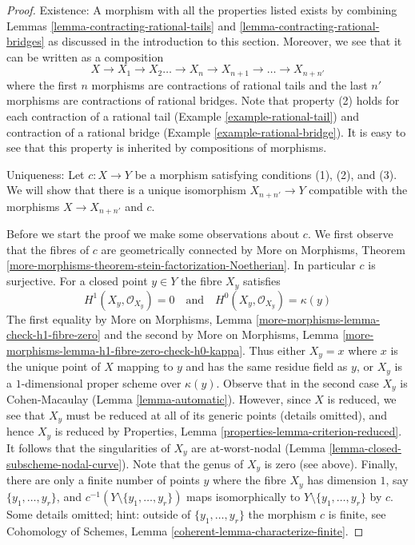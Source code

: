 \begin{proof}
Existence: A morphism with all the properties listed exists by
combining Lemmas \ref{lemma-contracting-rational-tails} and
\ref{lemma-contracting-rational-bridges} as discussed in the
introduction to this section.
Moreover, we see that it can be written as a composition
$$
X \to X_1 \to X_2 \ldots \to X_n \to X_{n + 1} \to \ldots \to X_{n + n'}
$$
where the first $n$ morphisms are contractions of rational tails
and the last $n'$ morphisms are contractions of rational bridges.
Note that property (2) holds for each contraction of a rational
tail (Example \ref{example-rational-tail}) and contraction of a
rational bridge (Example \ref{example-rational-bridge}).
It is easy to see that this property is inherited by compositions of morphisms.

\medskip\noindent
Uniqueness: Let $c : X \to Y$ be a morphism satisfying conditions
(1), (2), and (3). We will show that there is a unique isomorphism
$X_{n + n'} \to Y$ compatible with the morphisms $X \to X_{n + n'}$ and $c$.

\medskip\noindent
Before we start the proof we make some observations about $c$.
We first observe that the fibres of $c$ are geometrically connected by
More on Morphisms, Theorem
\ref{more-morphisms-theorem-stein-factorization-Noetherian}.
In particular $c$ is surjective.
For a closed point $y \in Y$ the fibre $X_y$ satisfies
$$
H^1(X_y, \mathcal{O}_{X_y}) = 0
\quad\text{and}\quad
H^0(X_y, \mathcal{O}_{X_y}) = \kappa(y)
$$
The first equality by More on Morphisms, Lemma
\ref{more-morphisms-lemma-check-h1-fibre-zero}
and the second by More on Morphisms, Lemma
\ref{more-morphisms-lemma-h1-fibre-zero-check-h0-kappa}.
Thus either $X_y = x$ where $x$ is the unique point of $X$ mapping to
$y$ and has the same residue field as $y$, or $X_y$ is a $1$-dimensional
proper scheme over $\kappa(y)$. Observe that in the second case
$X_y$ is Cohen-Macaulay (Lemma \ref{lemma-automatic}).
However, since $X$ is reduced, we see that $X_y$ must be reduced
at all of its generic points (details omitted), and hence $X_y$
is reduced by Properties, Lemma \ref{properties-lemma-criterion-reduced}.
It follows that the singularities of $X_y$ are at-worst-nodal
(Lemma \ref{lemma-closed-subscheme-nodal-curve}).
Note that the genus of $X_y$ is zero (see above).
Finally, there are only a finite number of points $y$ where
the fibre $X_y$ has dimension $1$, say
$\{y_1, \ldots, y_r\}$, and $c^{-1}(Y \setminus \{y_1, \ldots, y_r\})$
maps isomorphically to $Y \setminus \{y_1, \ldots, y_r\}$ by $c$.
Some details omitted; hint: outside of $\{y_1, \ldots, y_r\}$
the morphism $c$ is finite, see
Cohomology of Schemes, Lemma \ref{coherent-lemma-characterize-finite}.


\end{proof}
